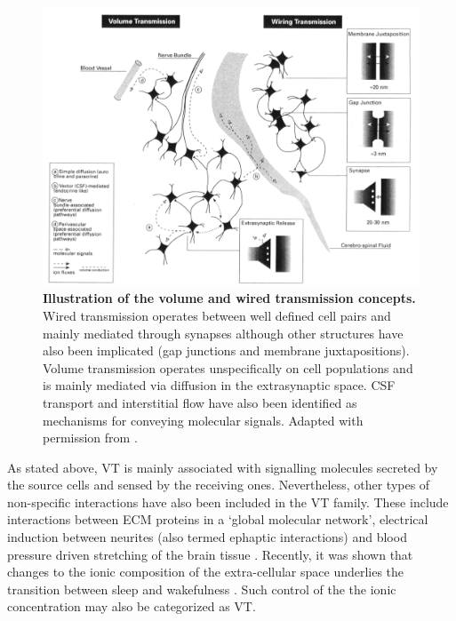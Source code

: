     \begin{figure}[!htb]
        \centering
        \includegraphics[width=14cm]{chapter1/figures/volTrans/volTrans.jpg}
        \caption[Illustration of the volume and wired transmission concepts]{\textbf{Illustration of the volume and wired transmission concepts.} Wired transmission operates between well defined cell pairs and mainly mediated through synapses although other structures have also been implicated (gap junctions and membrane juxtapositions). Volume transmission operates unspecifically on cell populations and is mainly mediated via diffusion in the extrasynaptic space. CSF transport and interstitial flow have also been identified as mechanisms for conveying molecular signals. Adapted with permission from \cite{agnati1995intercellular}.}
        \label{fig:introduction:volTrans}
    \end{figure}

    As stated above, VT is mainly associated with signalling molecules secreted by the source cells and sensed by the receiving ones. Nevertheless, other types of non-specific interactions have also been included in the VT family. These include interactions between ECM proteins in a `global molecular network', electrical induction between neurites (also termed ephaptic interactions) and blood pressure driven stretching of the brain tissue \cite{agnati2006volume}. Recently, it was shown that changes to the ionic composition of the extra-cellular space underlies the transition between sleep and wakefulness \cite{ding2016changes}. Such control of the the ionic concentration may also be categorized as VT.

